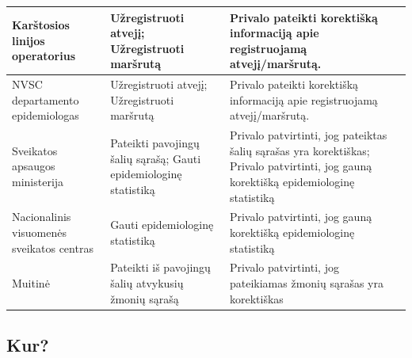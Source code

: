 \documentclass{VUMIFPSkursinis}
\begin{document}
\begin{center}
\begin{longtable}{|L{3cm}|C{5cm}|C{7cm}|}
		Karštosios linijos operatorius                                                                                          &
		Užregistruoti atvejį; Užregistruoti maršrutą                                                                            &
		Privalo pateikti korektišką informaciją apie registruojamą atvejį/maršrutą.                                                                                    \\ \hline
		NVSC departamento epidemiologas                                                                                         &
		Užregistruoti atvejį; Užregistruoti maršrutą                                                                            &
		Privalo pateikti korektišką informaciją apie registruojamą atvejį/maršrutą.                                                                                    \\ \hline
		Sveikatos apsaugos ministerija                                                                                          &
		Pateikti pavojingų šalių sąrašą; Gauti epidemiologinę statistiką                                                        &
		Privalo patvirtinti, jog pateiktas šalių sąrašas yra korektiškas; Privalo patvirtinti, jog gauną korektišką epidemiologinę statistiką                          \\ \hline
		Nacionalinis visuomenės sveikatos centras                                                                               &
		Gauti epidemiologinę statistiką                                                                                         &
		Privalo patvirtinti, jog gauną korektišką epidemiologinę statistiką                                                                                            \\ \hline
		Muitinė                                                                                                                 &
		Pateikti iš pavojingų šalių atvykusių žmonių sąrašą                                                                     &
		Privalo patvirtinti, jog pateikiamas žmonių sąrašas yra korektiškas                                                                                            \\ \hline
	\end{longtable}
\end{center}

\subsection{Kur?}\label{sec:versloReqWhere}
\end{document}

